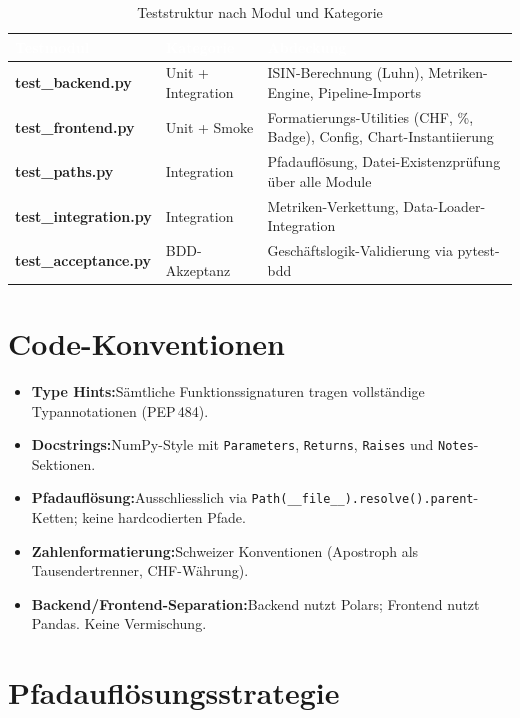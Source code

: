 \documentclass[11pt, a4paper, oneside, openany]{report}
\newcommand{\code}[1]{\texttt{\small\textcolor{DeepNavy}{#1}}}
\begin{document}
\begin{table}[H]
\centering
\caption{Teststruktur nach Modul und Kategorie}
\label{tab:tests}
\sffamily\small
\begin{tabularx}{\textwidth}{>{\ttfamily\bfseries}p{3.5cm} l X}
  \toprule
  \rowcolor{DeepNavy} \textcolor{white}{\textbf{Testmodul}} & \textcolor{white}{\textbf{Kategorie}} & \textcolor{white}{\textbf{Abdeckung}} \\
  \midrule
  test\_backend.py     & Unit + Integration   & ISIN-Berechnung (Luhn), Metriken-Engine, Pipeline-Imports \\
  test\_frontend.py    & Unit + Smoke         & Formatierungs-Utilities (CHF, \%, Badge), Config, Chart-Instantiierung \\
  test\_paths.py       & Integration          & Pfadauflösung, Datei-Existenzprüfung über alle Module \\
  test\_integration.py & Integration          & Metriken-Verkettung, Data-Loader-Integration \\
  test\_acceptance.py  & BDD-Akzeptanz        & Geschäftslogik-Validierung via pytest-bdd \\
  \bottomrule
\end{tabularx}
\end{table}

\section{Code-Konventionen}

\begin{itemize}
  \item \textbf{Type Hints:}\;Sämtliche Funktionssignaturen tragen vollständige Typannotationen (PEP\,484).
  \item \textbf{Docstrings:}\;NumPy-Style mit \code{Parameters}, \code{Returns}, \code{Raises} und \code{Notes}-Sektionen.
  \item \textbf{Pfadauflösung:}\;Ausschliesslich via \code{Path(\_\_file\_\_).resolve().parent}-Ketten; keine hardcodierten Pfade.
  \item \textbf{Zahlenformatierung:}\;Schweizer Konventionen (Apostroph als Tausendertrenner, CHF-Währung).
  \item \textbf{Backend/Frontend-Separation:}\;Backend nutzt Polars; Frontend nutzt Pandas. Keine Vermischung.
\end{itemize}

\section{Pfadauflösungsstrategie}
\end{document}
